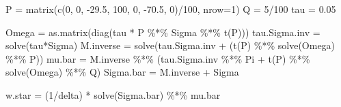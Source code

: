\documentclass[
]{article}
\newenvironment{Shaded}{\begin{snugshade}}{\end{snugshade}}
\newcommand{\AttributeTok}[1]{\textcolor[rgb]{0.77,0.63,0.00}{#1}}
\newcommand{\DecValTok}[1]{\textcolor[rgb]{0.00,0.00,0.81}{#1}}
\newcommand{\FloatTok}[1]{\textcolor[rgb]{0.00,0.00,0.81}{#1}}
\newcommand{\FunctionTok}[1]{\textcolor[rgb]{0.00,0.00,0.00}{#1}}
\newcommand{\NormalTok}[1]{#1}
\newcommand{\OtherTok}[1]{\textcolor[rgb]{0.56,0.35,0.01}{#1}}
\newcommand{\SpecialCharTok}[1]{\textcolor[rgb]{0.00,0.00,0.00}{#1}}
\begin{document}
\begin{Shaded}
\begin{Highlighting}[]
\NormalTok{P }\OtherTok{=} \FunctionTok{matrix}\NormalTok{(}\FunctionTok{c}\NormalTok{(}\DecValTok{0}\NormalTok{, }\DecValTok{0}\NormalTok{, }\SpecialCharTok{{-}}\FloatTok{29.5}\NormalTok{, }\DecValTok{100}\NormalTok{, }\DecValTok{0}\NormalTok{, }\SpecialCharTok{{-}}\FloatTok{70.5}\NormalTok{, }\DecValTok{0}\NormalTok{)}\SpecialCharTok{/}\DecValTok{100}\NormalTok{, }\AttributeTok{nrow=}\DecValTok{1}\NormalTok{)}
\NormalTok{Q }\OtherTok{=} \DecValTok{5}\SpecialCharTok{/}\DecValTok{100}
\NormalTok{tau }\OtherTok{=} \FloatTok{0.05}

\NormalTok{Omega }\OtherTok{=} \FunctionTok{as.matrix}\NormalTok{(}\FunctionTok{diag}\NormalTok{(tau }\SpecialCharTok{*}\NormalTok{ P }\SpecialCharTok{\%*\%}\NormalTok{ Sigma }\SpecialCharTok{\%*\%} \FunctionTok{t}\NormalTok{(P)))}
\NormalTok{tau.Sigma.inv }\OtherTok{=} \FunctionTok{solve}\NormalTok{(tau}\SpecialCharTok{*}\NormalTok{Sigma)}
\NormalTok{M.inverse }\OtherTok{=} \FunctionTok{solve}\NormalTok{(tau.Sigma.inv }\SpecialCharTok{+}\NormalTok{ (}\FunctionTok{t}\NormalTok{(P) }\SpecialCharTok{\%*\%} \FunctionTok{solve}\NormalTok{(Omega) }\SpecialCharTok{\%*\%}\NormalTok{ P))}
\NormalTok{mu.bar }\OtherTok{=}\NormalTok{ M.inverse }\SpecialCharTok{\%*\%}\NormalTok{ (tau.Sigma.inv }\SpecialCharTok{\%*\%}\NormalTok{ Pi }\SpecialCharTok{+} \FunctionTok{t}\NormalTok{(P) }\SpecialCharTok{\%*\%} \FunctionTok{solve}\NormalTok{(Omega) }\SpecialCharTok{\%*\%}\NormalTok{ Q)}
\NormalTok{Sigma.bar }\OtherTok{=}\NormalTok{ M.inverse }\SpecialCharTok{+}\NormalTok{ Sigma}

\NormalTok{w.star }\OtherTok{=}\NormalTok{ (}\DecValTok{1}\SpecialCharTok{/}\NormalTok{delta) }\SpecialCharTok{*} \FunctionTok{solve}\NormalTok{(Sigma.bar) }\SpecialCharTok{\%*\%}\NormalTok{ mu.bar}


\end{Highlighting}
\end{Shaded}
\end{document}
